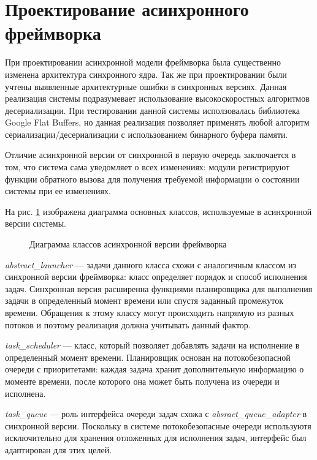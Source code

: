 \section{Проектирование асинхронного фреймворка}

При проектировании асинхронной модели фреймворка была существенно изменена архитектура синхронного ядра. Так же при проектировании были учтены выявленные архитектурные ошибки в синхронных версиях. Данная реализация системы подразумевает использование высокоскоростных алгоритмов десериализации. При тестировании данной системы исползовалась библиотека Google Flat Buffers, но данная реализация позволяет применять любой алгоритм сериализации/десериализации с использованием бинарного буфера памяти.

Отличие асинхронной версии от синхронной в первую очередь заключается в том, что система сама уведомляет о всех изменениях: модули регистрируют функции обратного вызова для получения требуемой информации о состоянии системы при ее изменениях.

На рис. \ref{im:2_3_1_async} изображена диаграмма основных классов, используемые в асинхронной версии системы.

\begin{figure}[h]
    \caption{Диаграмма классов асинхронной версии фреймворка}
    \label{im:2_3_1_async}
\end{figure}

\textit{abstract\_launcher} --- задачи данного класса схожи с аналогичным классом из синхронной версии фреймворка: класс определяет порядок и способ исполнения задач. Синхронная версия расширенна функциями планировщика для выполнения задачи в определенный момент времени или спустя заданный промежуток времени. Обращения к этому классу могут происходить напрямую из разных потоков и поэтому реализация должна учитывать данный фактор.

\textit{task\_scheduler} --- класс, который позволяет добавлять задачи на исполнение в определенный момент времени. Планировщик основан на потокобезопасной очереди с приоритетами: каждая задача хранит дополнительную информацию о моменте времени, после которого она может быть получена из очереди и исполнена.

\textit{task\_queue} --- роль интерфейса очереди задач схожа с \textit{absract\_queue\_adapter} в синхронной версии. Поскольку в системе потокобезопасные очереди используютя исключительно для хранения отложенных для исполнения задач, интерфейс был адаптирован для этих целей.

